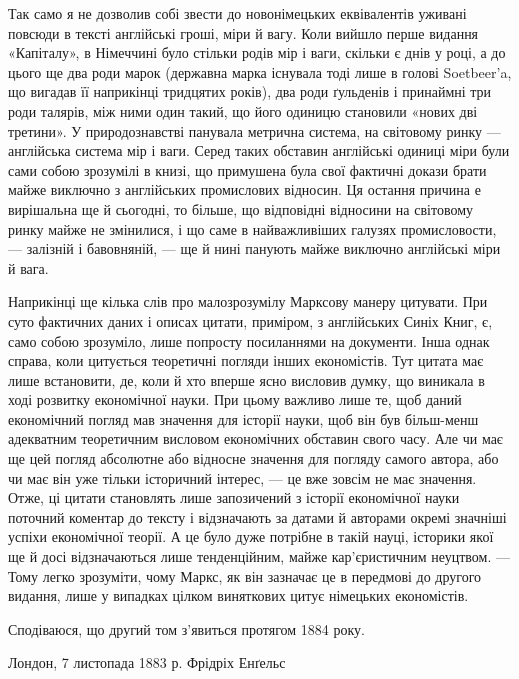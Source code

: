 Так само я не дозволив собі звести до новонімецьких еквівалентів
уживані повсюди в тексті англійські гроші, міри й вагу. Коли
вийшло перше видання «Капіталу», в Німеччині було стільки
родів мір і ваги, скільки є днів у році, а до цього ще два роди
марок (державна марка існувала тоді лише в голові Soetbeer’a, що
вигадав її наприкінці тридцятих років), два роди ґульденів і
принаймні три роди талярів, між ними один такий, що його одиницю
становили «нових дві третини». У природознавстві панувала
метрична система, на світовому ринку — англійська система мір
і ваги. Серед таких обставин англійські одиниці міри були сами
собою зрозумілі в книзі, що примушена була свої фактичні докази
брати майже виключно з англійських промислових відносин. Ця
остання причина е вирішальна ще й сьогодні, то більше, що відповідні
відносини на світовому ринку майже не змінилися, і що саме
в найважливіших галузях промисловости, — залізній і бавовняній,
— ще й нині панують майже виключно англійські міри й вага.

Наприкінці ще кілька слів про малозрозумілу Марксову
манеру цитувати. При суто фактичних даних і описах цитати,
приміром, з англійських Синіх Книг, є, само собою зрозуміло,
лише попросту посиланнями на документи. Інша однак справа,
коли цитується теоретичні погляди інших економістів. Тут цитата
має лише встановити, де, коли й хто вперше ясно висловив
думку, що виникала в ході розвитку економічної науки. При
цьому важливо лише те, щоб даний економічний погляд мав
значення для історії науки, щоб він був більш-менш адекватним
теоретичним висловом економічних обставин свого часу. Але
чи має ще цей погляд абсолютне або відносне значення для погляду
самого автора, або чи має він уже тільки історичний
інтерес, — це вже зовсім не має значення. Отже, ці цитати становлять
лише запозичений з історії економічної науки поточний
коментар до тексту і відзначають за датами й авторами окремі
значніші успіхи економічної теорії. А це було дуже потрібне в
такій науці, історики якої ще й досі відзначаються лише тенденційним,
майже кар’єристичним неуцтвом. — Тому легко зрозуміти,
чому Маркс, як він зазначає це в передмові до другого видання,
лише у випадках цілком виняткових цитує німецьких економістів.

Сподіваюся, що другий том з’явиться протягом 1884 року.

Лондон, 7 листопада 1883 р. Фрідріх Енґельс
